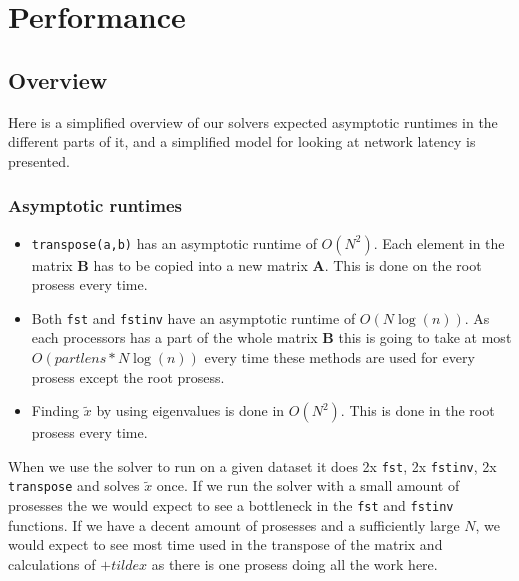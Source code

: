 \section{Performance} %
\label{sec:performance}

\subsection{Overview} %
\label{sub:overview}
Here is a simplified overview of our solvers expected asymptotic runtimes in the different parts of it, and a simplified model for looking at network latency is presented.

\subsubsection{Asymptotic runtimes} %
\label{ssub:asymptotic_runtimes}

\begin{itemize}

  \item \texttt{transpose(a,b)} has an asymptotic runtime of $O(N^2)$. Each element in the matrix \textbf{B} has to be copied into a new matrix \textbf{A}. This is done on the root prosess every time.

  \item Both \texttt{fst} and \texttt{fstinv} have an asymptotic runtime of $O(N\log(n))$. As each processors has a part of the whole matrix \textbf{B} this is going to take at most $O(partlens * N\log(n))$ every time these methods are used for every prosess except the root prosess.

  \item Finding $\tilde{x}$ by using eigenvalues is done in $O(N^2)$. This is done in the root prosess every time.

\end{itemize}

When we use the solver to run on a given dataset it does 2x \texttt{fst}, 2x \texttt{fstinv}, 2x \texttt{transpose} and solves $\tilde{x}$ once. If we run the solver with a small amount of prosesses the we would expect to see a bottleneck in the \texttt{fst} and \texttt{fstinv} functions. If we have a decent amount of prosesses and a sufficiently large $N$, we would expect to see most time used in the transpose of the matrix and calculations of $+tilde{x}$ as there is one prosess doing all the work here.


